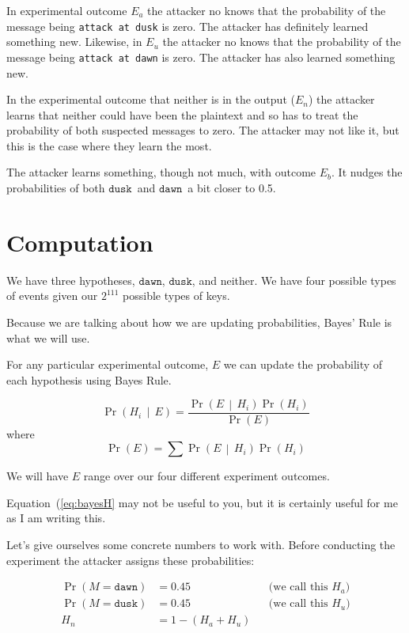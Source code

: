 \documentclass[11pt]{article}
\newcommand{\prob}[1]{\ensuremath{\operatorname{Pr}\left( #1 \right)}}
\newcommand{\condprob}[2]{\prob{#1\, \middle|\, #2}}
\newcommand\mdusk{\ensuremath{\mathtt{dusk}}}
\newcommand\mdawn{\ensuremath{\mathtt{dawn}}}
\begin{document}
In experimental outcome $E_a$ the attacker no knows that the probability of the message being \texttt{attack at dusk} is zero.
The attacker has definitely learned something new.
Likewise, in $E_u$ the attacker no knows that the probability of the message being \texttt{attack at dawn} is zero.
The attacker has also learned something new.

In the experimental outcome that neither is in the output ($E_n$) the attacker learns
that neither could have been the plaintext and so has to treat the probability of both suspected messages to zero. The attacker may not like it, but this is the case where they learn the most.

The attacker learns something, though not much, with outcome $E_b$.
It nudges the probabilities of both \mdusk\ and \mdawn\ a bit closer to 0.5.

\section{Computation}

We have three hypotheses, \mdawn, \mdusk, and neither.
We have four possible types of events given our $2^{111}$ possible types of keys.

Because we are talking about how we are updating probabilities, Bayes' Rule is what we will use.

For any particular experimental outcome, $E$ we can update the probability of each hypothesis using Bayes Rule.

\begin{equation}\label{eq:bayesH}
    \condprob{H_i}{E} = \frac{\condprob{E}{H_i}\prob{H_i}}{\prob{E}}
\end{equation}
where
\begin{equation}\label{eq:ProbE}
    \prob{E} = \sum \condprob{E}{H_i}\prob{H_i}
\end{equation}

We will have $E$ range over our four different experiment outcomes.

Equation~(\ref{eq:bayesH} may not be useful to you, but it is certainly useful for me as I am writing this.

Let's give ourselves some concrete numbers to work with.
Before conducting the experiment the attacker assigns these probabilities:

\begin{align*}
    \prob{M = \mdawn} &= 0.45 && \text{(we call this $H_a$)} \\
    \prob{M = \mdusk} &= 0.45  && \text{(we call this $H_u$)} \\
    H_n & = 1 - (H_a + H_u) 
\end{align*}
\end{document}
